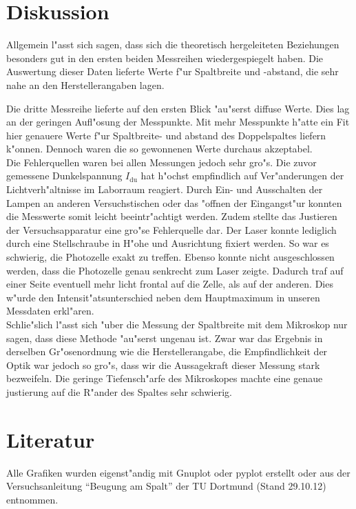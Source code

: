 \section{Diskussion}
	\label{sec:diskussion}

	Allgemein l"asst sich sagen, dass sich die theoretisch hergeleiteten Beziehungen besonders gut in den ersten beiden Messreihen wiedergespiegelt haben.
	Die Auswertung dieser Daten lieferte Werte f"ur Spaltbreite und -abstand, die sehr nahe an den Herstellerangaben lagen.

	Die dritte Messreihe lieferte auf den ersten Blick "au"serst diffuse Werte. Dies lag an der geringen Aufl"osung der Messpunkte.
	Mit mehr Messpunkte h"atte ein Fit hier genauere Werte f"ur Spaltbreite- und abstand des Doppelspaltes liefern k"onnen. Dennoch waren die so gewonnenen Werte durchaus akzeptabel.\\

	Die Fehlerquellen waren bei allen Messungen jedoch sehr gro"s.
	Die zuvor gemessene Dunkelspannung $I_\mathrm{du}$ hat h"ochst empfindlich auf Ver"anderungen der Lichtverh"altnisse im Laborraum reagiert.
	Durch Ein- und Ausschalten der Lampen an anderen Versuchstischen oder das "offnen der Eingangst"ur konnten die Messwerte somit leicht beeintr"achtigt werden.
	Zudem stellte das Justieren der Versuchsapparatur eine gro"se Fehlerquelle dar.
	Der Laser konnte lediglich durch eine Stellschraube in H"ohe und Ausrichtung fixiert werden.
	So war es schwierig, die Photozelle exakt zu treffen.
	Ebenso konnte nicht ausgeschlossen werden, dass die Photozelle genau senkrecht zum Laser zeigte.
	Dadurch traf auf einer Seite eventuell mehr licht frontal auf die Zelle, als auf der anderen.
	Dies w"urde den Intensit"atsunterschied neben dem Hauptmaximum in unseren Messdaten erkl"aren.\\
	
	Schlie"slich l"asst sich "uber die Messung der Spaltbreite mit dem Mikroskop nur sagen, dass diese Methode "au"serst ungenau ist.
	Zwar war das Ergebnis in derselben Gr"osenordnung wie die Herstellerangabe, die Empfindlichkeit der Optik war jedoch so gro"s, dass wir die Aussagekraft dieser Messung stark bezweifeln.
	Die geringe Tiefensch"arfe des Mikroskopes machte eine genaue justierung auf die R"ander des Spaltes sehr schwierig.

\section{Literatur}

	Alle Grafiken wurden eigenst"andig mit Gnuplot oder pyplot erstellt oder aus der Versuchsanleitung "`Beugung am Spalt"' der TU Dortmund (Stand 29.10.12) entnommen.